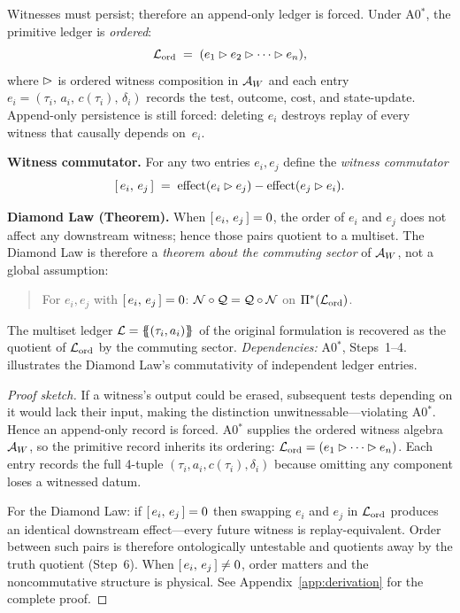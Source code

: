 \begin{theorem}
\label{thm:ledger}
Witnesses must persist; therefore an append-only ledger is forced.  Under A0$^*$, the
primitive ledger is \emph{ordered}:
\[
  \mathcal{L}_{\mathrm{ord}} \;=\; (e_1 \mathbin{\vartriangleright} e_2 \mathbin{\vartriangleright} \cdots \mathbin{\vartriangleright} e_n),
\]
where $\mathbin{\vartriangleright}$ is ordered witness composition in $\mathcal{A}_W$ and each entry
$e_i = (\tau_i,\, a_i,\, c(\tau_i),\, \delta_i)$ records the test, outcome,
cost, and state-update.  Append-only persistence is still forced: deleting
$e_i$ destroys replay of every witness that causally depends on~$e_i$.

\medskip\noindent
\textbf{Witness commutator.}  For any two entries $e_i, e_j$ define the
\emph{witness commutator}
\[
  [\,e_i,\,e_j\,]
    \;=\; \mathrm{effect}(e_i \mathbin{\vartriangleright} e_j)
         - \mathrm{effect}(e_j \mathbin{\vartriangleright} e_i).
\]

\medskip\noindent
\textbf{Diamond Law (Theorem).}
When $[\,e_i,\,e_j\,] = 0$, the order of $e_i$ and $e_j$ does not
affect any downstream witness; hence those pairs quotient to a multiset.
The Diamond Law is therefore a \emph{theorem about the commuting sector}
of $\mathcal{A}_W$, not a global assumption:
\begin{quote}
For $e_i, e_j$ with $[\,e_i,\,e_j\,] = 0$: \;
$\mathcal{N} \circ \mathcal{Q} = \mathcal{Q} \circ \mathcal{N}$ on $\Pi^*(\mathcal{L}_{\mathrm{ord}})$.
\end{quote}
The multiset ledger $\mathcal{L} = \{\!\!\{(\tau_i, a_i)\}\!\!\}$ of the
original formulation is recovered as the quotient of $\mathcal{L}_{\mathrm{ord}}$ by the
commuting sector.
\emph{Dependencies:} A0$^*$, Steps~1--4.
 illustrates the Diamond Law's commutativity of independent ledger entries.
\begin{proof}[Proof sketch]
If a witness's output could be erased, subsequent tests depending on it would
lack their input, making the distinction unwitnessable---violating A0$^*$.
Hence an append-only record is forced.  A0$^*$ supplies the ordered witness
algebra $\mathcal{A}_W$, so the primitive record inherits its ordering:
$\mathcal{L}_{\mathrm{ord}} = (e_1 \mathbin{\vartriangleright} \cdots \mathbin{\vartriangleright} e_n)$.  Each entry records
the full 4-tuple $(\tau_i, a_i, c(\tau_i), \delta_i)$ because omitting any
component loses a witnessed datum.

For the Diamond Law: if $[\,e_i,\,e_j\,] = 0$ then swapping $e_i$
and $e_j$ in $\mathcal{L}_{\mathrm{ord}}$ produces an identical downstream effect---every
future witness is replay-equivalent.  Order between such pairs is therefore
ontologically untestable and quotients away by the truth quotient (Step~6).
When $[\,e_i,\,e_j\,] \neq 0$, order matters and the
noncommutative structure is physical.
See Appendix~\ref{app:derivation} for the complete proof.
\end{proof}
\end{theorem}

